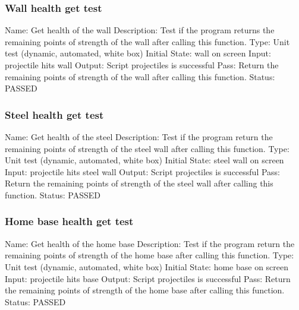 \documentclass{article}
\begin{document}
\subsubsection{Wall health get test}
\label{sec:3.2.10}
Name:  Get health of the wall\newline
Description: Test if the program returns the remaining points of strength of 
the wall after calling this function. \newline
Type: Unit test (dynamic, automated, white box) \newline
Initial State:  wall on screen\newline
Input: projectile hits wall\newline
Output: Script projectiles is successful  \newline
Pass:  Return the remaining points of strength of the wall after calling this 
function. \newline
\newline Status: PASSED

\subsubsection{Steel health get test}
\label{sec:3.2.11}
Name:  Get health of the steel\newline
Description: Test if the program return the remaining points of strength of 
the steel wall after calling this function. \newline
Type: Unit test (dynamic, automated, white box) \newline
Initial State:  steel wall on screen\newline
Input: projectile hits steel wall\newline
Output: Script projectiles is successful  \newline
Pass:  Return the remaining points of strength of the steel wall after calling this 
function. \newline
\newline Status: PASSED

\subsubsection{Home base health get test}
\label{sec:3.2.12}
Name:  Get health of the home base\newline
Description: Test if the program return the remaining points of strength of the
home base after calling this function. \newline
Type: Unit test (dynamic, automated, white box) \newline
Initial State:  home base on screen\newline
Input: projectile hits base\newline
Output: Script projectiles is successful  \newline
Pass:  Return the remaining points of strength of the home base after calling 
this function. \newline
\newline Status: PASSED
\end{document}
